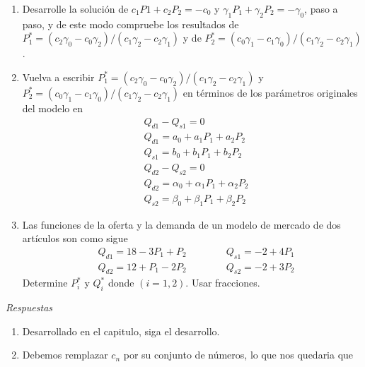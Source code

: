 \begin{ejercicio}
    \begin{enumerate}
        \item Desarrolle la solución de \(c_1P1+c_2P_2=-c_0\) y \(\gamma_1P_1+\gamma_2P_2=-\gamma_0\), paso a paso, y de este modo compruebe los resultados de \(P_1^\ast=(c_2\gamma_0-c_0\gamma_2)/(c_1\gamma_2-c_2\gamma_1)\) y de \(P_2^\ast=(c_0\gamma_1-c_1\gamma_0)/(c_1\gamma_2-c_2\gamma_1)\).
        \item Vuelva a escribir \(P_1^\ast=(c_2\gamma_0-c_0\gamma_2)/(c_1\gamma_2-c_2\gamma_1)\) y \(P_2^\ast=(c_0\gamma_1-c_1\gamma_0)/(c_1\gamma_2-c_2\gamma_1)\) en términos de los parámetros originales del modelo en 
        \begin{equation}
            \begin{aligned}
                & Q_{d1}-Q_{s1}=0 \\
                & Q_{d1}=a_0+a_1P_1+a_2P_2 \\ 
                & Q_{s1}=b_0+b_1P_1+b_2P_2 \\
                & Q_{d2}-Q_{s2}=0 \\
                & Q_{d2}=\alpha_0+\alpha_1P_1+\alpha_2P_2 \\
                & Q_{s2}=\beta_0+\beta_1P_1+\beta_2P_2
            \end{aligned}
        \end{equation}
        \item Las funciones de la oferta y la demanda de un modelo de mercado de dos artículos son como sigue
            \begin{equation}
            \begin{aligned}
                & Q_{d1}=18-3P_1+P_2 \qquad \qquad Q_{s1} = -2+4P_1 \\
                & Q_{d2}=12+P_1-2P_2 \qquad \qquad Q_{s2} = -2+3P_2
            \end{aligned}
        \end{equation}
        Determine \(P_i^\ast\) y \(Q_i^\ast\) donde \((i=1,2)\). Usar fracciones.
    \end{enumerate}
    \emph{Respuestas}
    \begin{enumerate}
        \item Desarrollado en el capitulo, siga el desarrollo.
        \item Debemos remplazar \(c_n\) por su conjunto de números, lo que nos quedaria que 
        \begin{equation}
        \begin{aligned}

\end{aligned}
\end{equation}
\end{enumerate}
\end{ejercicio}
